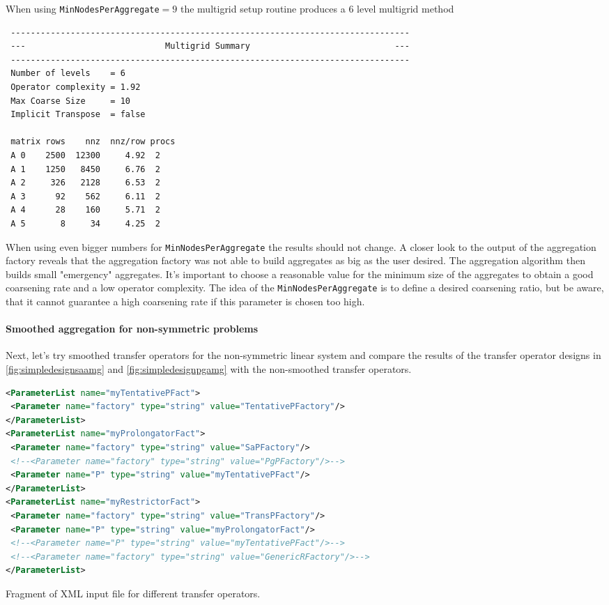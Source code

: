 \documentclass[12pt,a4paper]{article}
\begin{document}
When using \verb|MinNodesPerAggregate|$=9$ the multigrid setup routine produces a 6 level multigrid method
{\footnotesize
\begin{verbatim}
 --------------------------------------------------------------------------------
 ---                            Multigrid Summary                             ---
 --------------------------------------------------------------------------------
 Number of levels    = 6
 Operator complexity = 1.92
 Max Coarse Size     = 10
 Implicit Transpose  = false

 matrix rows    nnz  nnz/row procs
 A 0    2500  12300     4.92  2
 A 1    1250   8450     6.76  2
 A 2     326   2128     6.53  2
 A 3      92    562     6.11  2
 A 4      28    160     5.71  2
 A 5       8     34     4.25  2
\end{verbatim}}

When using even bigger numbers for \verb|MinNodesPerAggregate| the results should not change. A closer look to the output of the aggregation factory reveals that the aggregation factory was not able to build aggregates as big as the user desired. The aggregation algorithm then builds small "emergency" aggregates. It's important to choose a reasonable value for the minimum size of the aggregates to obtain a good coarsening rate and a low operator complexity. The idea of the \verb|MinNodesPerAggregate| is to define a desired coarsening ratio, but be aware, that it cannot guarantee a high coarsening rate if this parameter is chosen too high.

\paragraph{Smoothed aggregation for non-symmetric problems}
Next, let's try smoothed transfer operators for the non-symmetric linear system and compare the results of the transfer operator designs in \ref{fig:simpledesignsaamg} and \ref{fig:simpledesignpgamg} with the non-smoothed transfer operators.

\begin{Listing}
\begin{center}
\begin{lstlisting}[language=xml]
<ParameterList name="myTentativePFact">
 <Parameter name="factory" type="string" value="TentativePFactory"/>
</ParameterList>
<ParameterList name="myProlongatorFact">
 <Parameter name="factory" type="string" value="SaPFactory"/>
 <!--<Parameter name="factory" type="string" value="PgPFactory"/>-->
 <Parameter name="P" type="string" value="myTentativePFact"/>
</ParameterList>
<ParameterList name="myRestrictorFact">
 <Parameter name="factory" type="string" value="TransPFactory"/>
 <Parameter name="P" type="string" value="myProlongatorFact"/>
 <!--<Parameter name="P" type="string" value="myTentativePFact"/>-->
 <!--<Parameter name="factory" type="string" value="GenericRFactory"/>-->
</ParameterList>
\end{lstlisting}
\caption{Fragment of XML input file for different transfer operators.}
\label{listing:Transfers}
\end{center}
\end{Listing}
\end{document}
